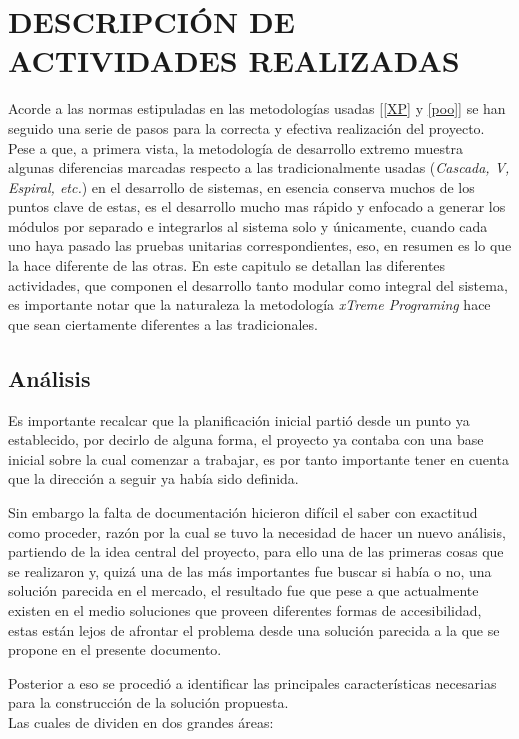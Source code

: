 \documentclass[12pt]{book} %
\begin{document}
		


\chapter{DESCRIPCIÓN DE ACTIVIDADES REALIZADAS}
\thispagestyle{empty}
\newpage

	Acorde a las normas estipuladas en las metodologías usadas [\ref{XP} y \ref{poo}] se han seguido una serie de pasos para la correcta 
	y efectiva realización del proyecto. Pese a que, a primera vista, la metodología de desarrollo extremo muestra algunas diferencias marcadas 
	respecto a las tradicionalmente usadas (\textit{Cascada, V, Espiral, etc.}) en el desarrollo de sistemas, en esencia conserva muchos de 
	los puntos clave de estas, es el desarrollo mucho mas rápido y enfocado a generar los módulos por separado e
	integrarlos al sistema solo y únicamente, cuando cada uno haya pasado las pruebas unitarias correspondientes, eso, en resumen es lo que 
	la hace diferente de las otras.
	En este capitulo se detallan las diferentes actividades, que componen el desarrollo tanto modular como integral del sistema, es importante 
	notar que la naturaleza la metodología \textit{xTreme Programing} hace que sean ciertamente diferentes a las tradicionales.
\section{Análisis}
	Es importante recalcar que la planificación inicial partió desde un punto ya establecido, por decirlo de alguna forma, el proyecto ya contaba
	con una base inicial sobre la cual comenzar a trabajar, es por tanto importante tener en cuenta que la dirección a seguir ya había sido definida.
	
	Sin embargo la falta de documentación hicieron difícil el saber con exactitud como proceder, razón por la cual se tuvo la necesidad de hacer 
	un nuevo análisis, partiendo de la idea central del proyecto, para ello una de las primeras cosas que se realizaron y, quizá una de las más
	importantes fue buscar si había o no, una solución parecida en el mercado, el resultado fue que pese a que actualmente existen en el medio
	soluciones que proveen diferentes formas de accesibilidad, estas están lejos de afrontar el problema desde una solución parecida a la que se 
	propone en el presente documento.
	
	Posterior a eso se procedió a identificar las principales características necesarias para la construcción de la solución propuesta.\\
	Las cuales de dividen en dos grandes áreas:
\end{document}
